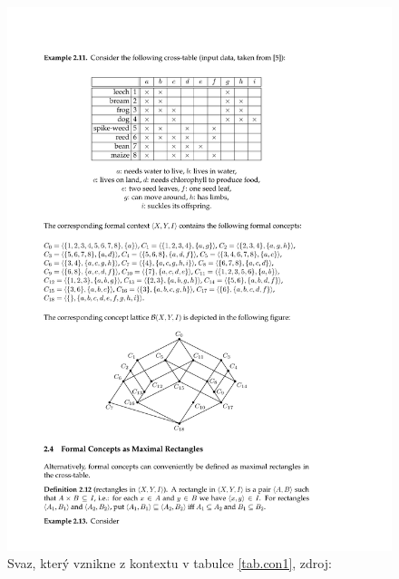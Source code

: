 \documentclass[12pt]{article}
\begin{document}
\begin{figure}
  \centering
  \includegraphics[width=14cm]{obrazky/svaz.pdf}
  \caption{Svaz, který vznikne z kontextu v tabulce \ref{tab.con1}, zdroj: \cite{belfcaskr}}
  \label{fig.lattice}
\end{figure}
\end{document}
